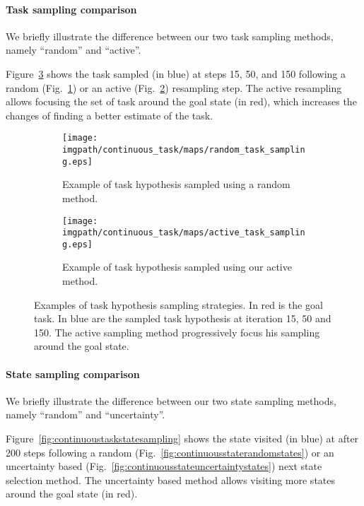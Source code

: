 \paragraph{Task sampling comparison}

We briefly illustrate the difference between our two task sampling methods, namely ``random'' and ``active''.

Figure~\ref{fig:continuoustasktasksampling} shows the task sampled (in blue) at steps 15, 50, and 150 following a random (Fig.~\ref{fig:continuoustaskrandomtask}) or an active (Fig.~\ref{fig:continuoustaskactivetask}) resampling step. The active resampling allows focusing the set of task around the goal state (in red), which increases the changes of finding a better estimate of the task.

\begin{figure}[!htbp]
\centering
    \begin{subfigure}[b]{\columnwidth}
        \centering
        \texttt{[image: \\imgpath/continuous\_task/maps/random\_task\_sampling.eps]}
        \caption{Example of task hypothesis sampled using a random method.}
        \label{fig:continuoustaskrandomtask}
    \end{subfigure}
    \begin{subfigure}[b]{\columnwidth}
        \centering
        \texttt{[image: \\imgpath/continuous\_task/maps/active\_task\_sampling.eps]}
        \caption{Example of task hypothesis sampled using our active method.}
        \label{fig:continuoustaskactivetask}
    \end{subfigure}
\caption{Examples of task hypothesis sampling strategies. In red is the goal task. In blue are the sampled task hypothesis at iteration 15, 50 and 150. The active sampling method progressively focus his sampling around the goal state.}
\label{fig:continuoustasktasksampling}
\end{figure}

\visuopti{\newpage}

\paragraph{State sampling comparison}

We briefly illustrate the difference between our two state sampling methods, namely ``random'' and ``uncertainty''.

Figure~\ref{fig:continuoustaskstatesampling} shows the state visited (in blue) at after 200 steps  following a random (Fig.~\ref{fig:continuousstaterandomstates}) or an uncertainty based (Fig.~\ref{fig:continuousstateuncertaintystates}) next state selection method. The uncertainty based method allows visiting more states around the goal state (in red).

